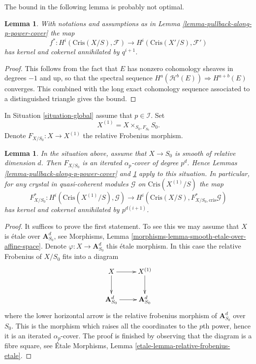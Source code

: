 \documentclass{stacks-project}
\theoremstyle{plain}
\newtheorem{lemma}[subsection]{Lemma}
\theoremstyle{definition}
\theoremstyle{remark}
\numberwithin{equation}{subsection}
\begin{document}
\noindent
The bound in the following lemma is probably not optimal.

\begin{lemma}
\label{lemma-pullback-along-p-power-cover-cohomology}
With notations and assumptions as in
Lemma \ref{lemma-pullback-along-p-power-cover}
the map
$$
f^* :
H^i(\text{Cris}(X/S), \mathcal{F})
\longrightarrow
H^i(\text{Cris}(X'/S), \mathcal{F}')
$$
has kernel and cokernel annihilated by $q^{i + 1}$.
\end{lemma}

\begin{proof}
This follows from the fact that $E$ has nonzero cohomology sheaves in
degrees $-1$ and up, so that the spectral sequence
$H^a(\mathcal{H}^b(E)) \Rightarrow H^{a + b}(E)$ converges.
This combined with the long exact cohomology sequence associated
to a distinguished triangle gives the bound.
\end{proof}

\noindent
In Situation \ref{situation-global} assume that $p \in \mathcal{I}$.
Set
$$
X^{(1)} = X \times_{S_0, F_{S_0}} S_0.
$$
Denote $F_{X/S_0} : X \to X^{(1)}$ the relative Frobenius morphism.

\begin{lemma}
\label{lemma-pullback-relative-frobenius}
In the situation above, assume that $X \to S_0$ is smooth of relative
dimension $d$. Then $F_{X/S_0}$ is an iterated $\alpha_p$-cover
of degree $p^d$. Hence Lemmas \ref{lemma-pullback-along-p-power-cover} and
\ref{lemma-pullback-along-p-power-cover-cohomology} apply to this
situation. In particular, for any crystal in quasi-coherent modules
$\mathcal{G}$ on $\text{Cris}(X^{(1)}/S)$ the map
$$
F_{X/S_0}^* : H^i(\text{Cris}(X^{(1)}/S), \mathcal{G})
\longrightarrow
H^i(\text{Cris}(X/S), F_{X/S_0, \text{cris}}^*\mathcal{G})
$$
has kernel and cokernel annihilated by $p^{d(i + 1)}$.
\end{lemma}

\begin{proof}
It suffices to prove the first statement. To see this we may assume
that $X$ is \'etale over $\mathbf{A}^d_{S_0}$, see
Morphisms, Lemma \ref{morphisms-lemma-smooth-etale-over-affine-space}.
Denote $\varphi : X \to \mathbf{A}^d_{S_0}$ this \'etale morphism.
In this case the relative Frobenius of $X/S_0$ fits into a diagram
$$
\xymatrix{
X \ar[d] \ar[r] & X^{(1)} \ar[d] \\
\mathbf{A}^d_{S_0} \ar[r] & \mathbf{A}^d_{S_0}
}
$$
where the lower horizontal arrow is the relative frobenius morphism
of $\mathbf{A}^d_{S_0}$ over $S_0$. This is the morphism which raises
all the coordinates to the $p$th power, hence it is an iterated
$\alpha_p$-cover. The proof is finished by observing that the diagram
is a fibre square, see
\'Etale Morphisms, Lemma \ref{etale-lemma-relative-frobenius-etale}.
\end{proof}
\end{document}
